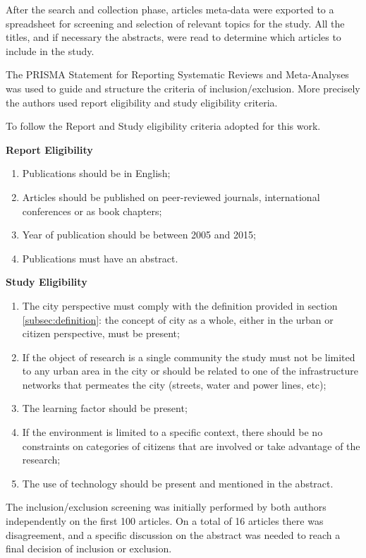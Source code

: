 After the search and collection phase, articles meta-data were exported to a spreadsheet for screening and selection of relevant topics for the study.
All the titles, and if necessary the abstracts, were read to determine which articles to include in the study.

The PRISMA Statement for Reporting Systematic Reviews and Meta-Analyses \cite{liberati_prisma_2009} was used to guide and structure the criteria of inclusion/exclusion.
More precisely the authors used report eligibility and study eligibility criteria.

To follow the Report and Study eligibility criteria adopted for this work.

\medskip

\textbf{Report Eligibility}
\begin{enumerate}
\item Publications should be in English;
\item Articles should be published on peer-reviewed journals, international conferences or as book chapters;
\item Year of publication should be between 2005 and 2015;
\item Publications must have an abstract.
\end{enumerate}

\medskip

\textbf{Study Eligibility}
\begin{enumerate}
\item The city perspective must comply with the definition provided in section \ref{subsec:definition}: the concept of city as a whole, either in the urban or citizen perspective, must be present;
\item If the object of research is a single community the study must not be limited to any urban area in the city or should be related to one of the infrastructure networks that permeates the city (streets, water and power lines, etc);
\item The learning factor should be present;
\item If the environment is limited to a specific context, there should be no constraints on categories of citizens that are involved or take advantage of the research;
\item The use of technology should be present and mentioned in the abstract.
\end{enumerate}

The inclusion/exclusion screening was initially performed by both authors independently on the first 100 articles. On a total of 16 articles there was disagreement, and a specific discussion on the abstract was needed to reach a final decision of inclusion or exclusion.

